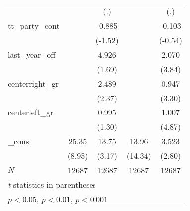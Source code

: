 {\begin{tabular}{l*{4}{c}}
            &                     &         (.)         &                     &         (.)         \\
[1em]
tt\_party\_cont&                     &      -0.885         &                     &      -0.103         \\
            &                     &     (-1.52)         &                     &     (-0.54)         \\
[1em]
last\_year\_off&                     &       4.926         &                     &       2.070\sym{***}\\
            &                     &      (1.69)         &                     &      (3.84)         \\
[1em]
centerright\_gr&                     &       2.489\sym{*}  &                     &       0.947\sym{***}\\
            &                     &      (2.37)         &                     &      (3.30)         \\
[1em]
centerleft\_gr&                     &       0.995         &                     &       1.007\sym{***}\\
            &                     &      (1.30)         &                     &      (4.87)         \\
[1em]
\_cons      &       25.35\sym{***}&       13.75\sym{**} &       13.96\sym{***}&       3.523\sym{**} \\
            &      (8.95)         &      (3.17)         &     (14.34)         &      (2.80)         \\
\hline
\(N\)       &       12687         &       12687         &       12687         &       12687         \\
\hline\hline
\multicolumn{5}{l}{\footnotesize \textit{t} statistics in parentheses}\\
\multicolumn{5}{l}{\footnotesize \sym{*} \(p<0.05\), \sym{**} \(p<0.01\), \sym{***} \(p<0.001\)}\\
\end{tabular}
}
